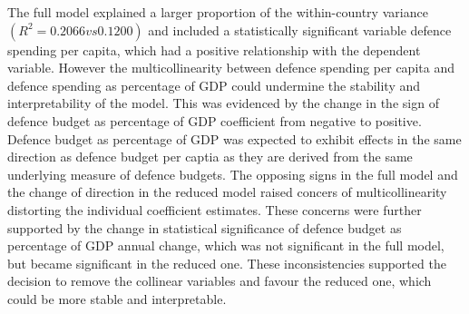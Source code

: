 The full model explained a larger proportion of the within-country variance $(R^2 = 0.2066 vs 0.1200)$
and included a statistically significant variable defence spending per capita, which had a positive 
relationship with the dependent variable. However the multicollinearity between defence spending per 
capita and defence spending as percentage of GDP could undermine the stability and interpretability 
of the model. This was evidenced by the change in the sign of defence budget as percentage of GDP 
coefficient from negative to positive. Defence budget as percentage of GDP was expected to exhibit 
effects in the same direction as defence budget per captia as they are derived from the same underlying 
measure of defence budgets. The opposing signs in the full model and the change of direction in the 
reduced model raised concers of multicollinearity distorting the individual coefficient estimates.
These concerns were further supported by the change in statistical significance of defence budget as 
percentage of GDP annual change, which was not significant in the full model, but became significant in 
the reduced one.
These inconsistencies supported the decision to remove the collinear variables and favour the reduced 
one, which could be more stable and interpretable.

\renewcommand{\arraystretch}{1.3}

\begin{table}[ht]
\small
\caption{Robustness check}
\centering
{}
\label{tab:robustness}
\end{table}

